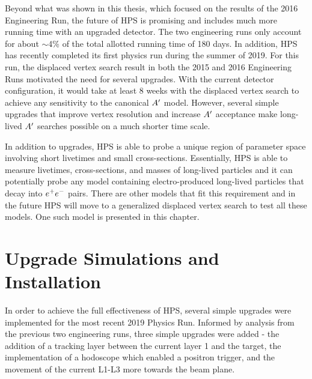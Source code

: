 
Beyond what was shown in this thesis, which focused on the results of the 2016 Engineering Run, the future of HPS is promising and includes much more running time with an upgraded detector. The two engineering runs only account for about $\sim$4\% of the total allotted running time of 180 days. In addition, HPS has recently completed its first physics run during the summer of 2019. For this run, the displaced vertex search result in both the 2015 and 2016 Engineering Runs motivated the need for several upgrades. With the current detector configuration, it would take at least 8 weeks with the displaced vertex search to achieve any sensitivity to the canonical $A^\prime$ model. However, several simple upgrades that improve vertex resolution and increase $A^\prime$ acceptance make long-lived $A^\prime$ searches possible on a much shorter time scale.

In addition to upgrades, HPS is able to probe a unique region of parameter space involving short livetimes and small cross-sections. Essentially, HPS is able to measure livetimes, cross-sections, and masses of long-lived particles and it can potentially probe any model containing electro-produced long-lived particles that decay into $e^{+}e^{-}$ pairs. There are other models that fit this requirement and in the future HPS will move to a generalized displaced vertex search to test all these models. One such model is presented in this chapter.

\section{Upgrade Simulations and Installation}\label{sec:L0}

In order to achieve the full effectiveness of HPS, several simple upgrades were implemented for the most recent 2019 Physics Run. Informed by analysis from the previous two engineering runs, three simple upgrades were added - the addition of a tracking layer between the current layer 1 and the target, the implementation of a hodoscope which enabled a positron trigger, and the movement of the current L1-L3 more towards the beam plane.

